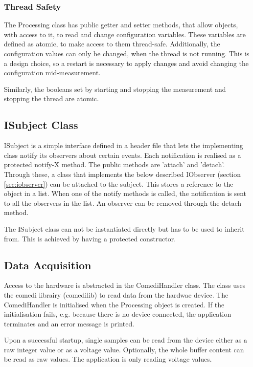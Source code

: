 \subsubsection{Thread Safety}
The Processing class has public getter and setter methods, that allow objects, with access to it, to read and change configuration variables. These variables are defined as atomic, to make access to them thread-safe. Additionally, the configuration values can only be changed, when the thread is not running. This is a design choice, so a restart is necessary to apply changes and avoid changing the configuration mid-measurement. 

Similarly, the booleans set by starting and stopping the measurement and stopping the thread are atomic.

\subsection{ISubject Class}\label{sec:isubject}
ISubject is a simple interface defined in a header file that lets the implementing class notify its observers about certain events. Each notification is realised as a protected notify-X method. The public methods are 'attach' and 'detach'. Through these, a class that implements the below described IObserver (section \ref{sec:iobserver}) can be attached to the subject. This stores a reference to the object in a list. When one of the notify methods is called, the notification is sent to all the observers in the list. An observer can be removed through the detach method. 

The ISubject class can not be instantiated directly but has to be used to inherit from. This is achieved by having a protected constructor.


\subsection{Data Acquisition}
Access to the hardware is abstracted in the ComediHandler class. The class uses the comedi librairy (comedilib) \citep{Comedi2017} to read data from the hardwae device. The ComediHandler is initialised when the Processing object is created. If the initialisation fails, e.g. because there is no device connected, the application terminates and an error message is printed.

Upon a successful startup, single samples can be read from the device either as a raw integer value or as a voltage value. Optionally, the whole buffer content can be read as raw values. The application is only reading voltage values.


